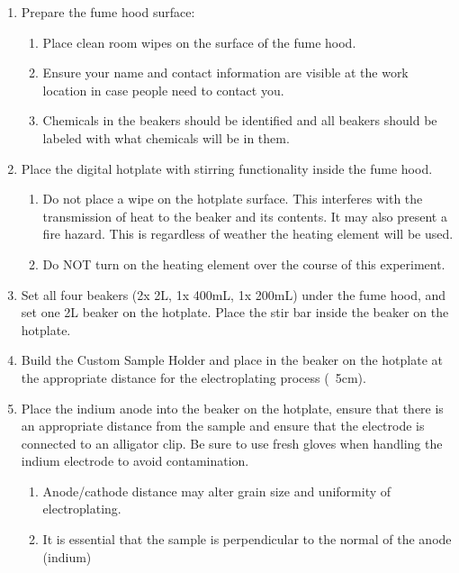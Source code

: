\begin{center} %
    \begin{framed} %
        \begin{minipage}{0.8\textwidth} %
            \raggedright %
            \setcounter{mpsection}{4}
            \begin{enumerate}
                \item Prepare the fume hood surface:
                \begin{enumerate}
                    \item Place clean room wipes on the surface of the fume hood.
                    \item Ensure your name and contact information are visible at the work location in case people need to contact you.
                    \item Chemicals in the beakers should be identified and all beakers should be labeled with what chemicals will be in them.
                \end{enumerate}
                \item Place the digital hotplate with stirring functionality inside the fume hood.
                \begin{enumerate}
                    \item Do not place a wipe on the hotplate surface. This interferes with the transmission of heat to the beaker and its contents. It may also present a fire hazard. This is regardless of weather the heating element will be used.
                    \item Do NOT turn on the heating element over the course of this experiment.
                \end{enumerate}
                \item Set all four beakers (2x 2L, 1x 400mL, 1x 200mL) under the fume hood, and set one 2L beaker on the hotplate. Place the stir bar inside the beaker on the hotplate.
                \item Build the Custom Sample Holder and place in the beaker on the hotplate at the appropriate distance for the electroplating process (~5cm).
                \item Place the indium anode into the beaker on the hotplate, ensure that there is an appropriate distance from the sample and ensure that the electrode is connected to an alligator clip. Be sure to use fresh gloves when handling the indium electrode to avoid contamination.
                \begin{enumerate}
                    \item Anode/cathode distance may alter grain size and uniformity of electroplating.
                    \item It is essential that the sample is perpendicular to the normal of the anode (indium)
                \end{enumerate}


\end{enumerate}
\end{minipage}
\end{framed}
\end{center}
